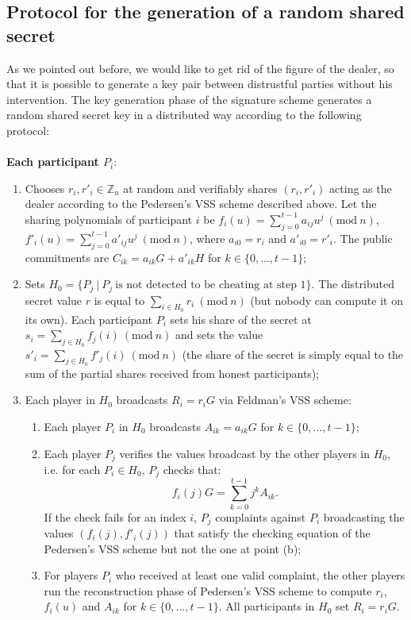 \bigskip

\subsection{Protocol for the generation of a random shared secret}
\label{subsec:2}
As we pointed out before, we would like to get rid of the figure of the dealer, so that it is possible to generate a key pair between distrustful parties without his intervention. The key generation phase of the signature scheme generates a random shared secret key in a distributed way according to the following protocol:
\\
\\
{\bf Each participant $P_i$}:
\begin{enumerate}
	\item Chooses $r_i, r'_i \in \mathbb{Z}_n$ at random and verifiably shares $(r_i, r'_i)$ acting as the dealer according to the Pedersen's VSS scheme described above. Let the sharing polynomials of participant $i$ be $f_i(u) = \sum_{j = 0}^{t - 1}a_{ij}u^j \ (\text{mod} \ n)$, $f'_i(u) = \sum_{j= 0}^{t - 1}a'_{ij}u^j \ (\text{mod} \ n)$, where $a_{i0} = r_i$ and $a'_{i0} = r'_i$. The public commitments are $C_{ik} = a_{ik}G + a'_{ik}H$ for $k \in \{0, ..., t - 1\}$;
	\item Sets $H_0 = \{P_j \ | \ P_j \ \text{is not detected to be cheating at step 1}\}$. The distributed secret value $r$ is equal to $\sum_{i \in H_0}r_i \ (\text{mod} \ n)$ (but nobody can compute it on its own). Each participant $P_i$ sets his share of the secret at $s_i= \sum_{j \in H_0}f_j(i) \ (\text{mod} \ n)$ and sets the value $s'_i = \sum_{j \in H_0}f'_j(i) \ (\text{mod} \ n)$ (the share of the secret is simply equal to the sum of the partial shares received from honest participants);
	\item Each player in $H_0$ broadcasts $R_i = r_iG$ via Feldman's VSS scheme:
	\begin{enumerate}
		\item Each player $P_i$ in $H_0$ broadcasts $A_{ik} = a_{ik}G$ for $k \in \{0, ..., t - 1\}$;
		\item Each player $P_j$ verifies the values broadcast by the other players in $H_0$, i.e. for each $P_i \in H_0$, $P_j$ checks that:
		$$f_i(j)G = \sum_{k = 0}^{t - 1} j^kA_{ik}.$$
		If the check fails for an index $i$, $P_j$ complaints against $P_i$ broadcasting the values $(f_i(j), f'_i(j))$ that satisfy the checking equation of the Pedersen's VSS scheme  but not the one at point (b);
		\item For players $P_i$ who received at least one valid complaint, the other players run the reconstruction phase of Pedersen's VSS scheme to compute $r_i$, $f_i(u)$ and $A_{ik}$ for $k \in \{0, ..., t - 1\}$. All participants in $H_0$ set $R_i = r_iG$. 
	\end{enumerate} 
\end{enumerate}
